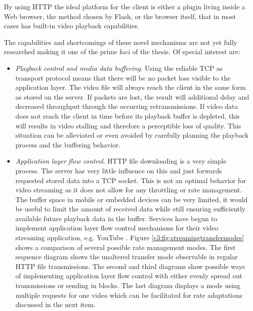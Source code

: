By using HTTP the ideal platform for the client is either a plugin living inside a Web browser, the method chosen by Flash, or the browser itself, that in most cases has built-in video playback capabilities.

The capabilities and shortcomings of these novel mechanisms are not yet fully researched making it one of the prime foci of the thesis. Of special interest are:
 
\begin{itemize}

\item \textit{Playback control and media data buffering}. Using the reliable TCP as transport protocol means that there will be no packet loss visible to the application layer. The video file will always reach the client in the same form as stored on the server. If packets are lost, the result will additional delay and decreased throughput through the occurring retransmissions. If video data does not reach the client in time before its playback buffer is depleted, this will results in video stalling and therefore a perceptible loss of quality. This situation can be alleviated or even avoided by carefully planning the playback process and the buffering behavior.

\item \textit{Application layer flow control}. HTTP file downloading is a very simple process. The server has very little influence on this and just forwards requested stored data into a TCP socket. This is not an optimal behavior for video streaming as it does not allow for any throttling or rate management. The buffer space in mobile or embedded devices can be very limited, it would be useful to limit the amount of received data while still ensuring sufficiently available future playback data in the buffer. Services have begun to implement application layer flow control mechanisms for their video streaming application, e.g. YouTube \cite{alcock2011afcyt}. Figure \ref{c3:fig:streamingtransfermodes} shows a comparison of several possible rate management modes. The first sequence diagram shows the unaltered transfer mode observable in regular HTTP file transmissions. The second and third diagrams show possible ways of implementing application layer flow control with either evenly spread out transmissions or sending in blocks. The last diagram displays a mode using multiple requests for one video which can be facilitated for rate adaptations discussed in the next item.


\end{itemize}
